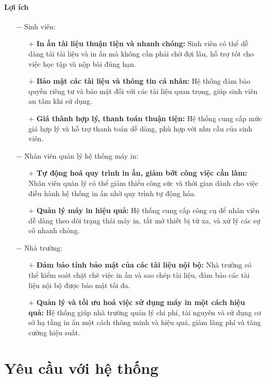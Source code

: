 \documentclass[a4paper]{article}
\begin{document}
\paragraph*{Lợi ích}
\begin{itemize}
    \item[$-$] Sinh viên:
    \begin{itemize}
        \item[$+$] \textbf{In ấn tài liệu thuận tiện và nhanh chóng:} Sinh viên có thể dễ dàng tải tài liệu và in ấn mà không cần phải chờ đợi lâu, hỗ trợ tốt cho việc học tập và nộp bài đúng hạn.
        \item[$+$] \textbf{Bảo mật các tài liệu và thông tin cá nhân:} Hệ thống đảm bảo quyền riêng tư và bảo mật đối với các tài liệu quan trọng, giúp sinh viên an tâm khi sử dụng.
        \item[$+$] \textbf{Giá thành hợp lý, thanh toán thuận tiện:} Hệ thống cung cấp mức giá hợp lý và hỗ trợ thanh toán dễ dàng, phù hợp với nhu cầu của sinh viên.
    \end{itemize}
    \item[$-$] Nhân viên quản lý hệ thống máy in:
    \begin{itemize}
        \item[$+$] \textbf{Tự động hoá quy trình in ấn, giảm bớt công việc cần làm:} Nhân viên quản lý có thể giảm thiểu công sức và thời gian dành cho việc điều hành hệ thống in ấn nhờ quy trình tự động hóa.
        \item[$+$] \textbf{Quản lý máy in hiệu quả:} Hệ thống cung cấp công cụ để nhân viên dễ dàng theo dõi trạng thái máy in, tắt mở thiết bị từ xa, và xử lý các sự cố nhanh chóng.
    \end{itemize}
    \item[$-$] Nhà trường:
    \begin{itemize}
        \item[$+$] \textbf{Đảm bảo tính bảo mật của các tài liệu nội bộ:} Nhà trường có thể kiểm soát chặt chẽ việc in ấn và sao chép tài liệu, đảm bảo các tài liệu nội bộ được bảo mật tối đa.
        \item[$+$] \textbf{Quản lý và tối ưu hoá việc sử dụng máy in một cách hiệu quả:} Hệ thống giúp nhà trường quản lý chi phí, tài nguyên và sử dụng cơ sở hạ tầng in ấn một cách thông minh và hiệu quả, giảm lãng phí và tăng cường hiệu suất.
    \end{itemize}
\end{itemize}
\section{Yêu cầu với hệ thống}
\end{document}

